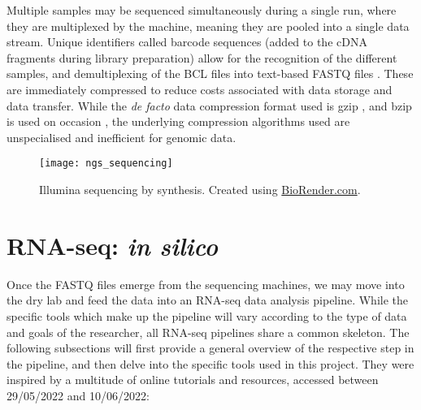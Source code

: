Multiple samples may be sequenced simultaneously during a single run, where they are multiplexed by the machine, meaning they are pooled into a single data stream. Unique identifiers called barcode sequences (added to the cDNA fragments during library preparation) allow for the recognition of the different samples, and demultiplexing of the BCL files into text-based FASTQ files \citep{cock2010sanger}. These are immediately compressed to reduce costs associated with data storage and data transfer. While the \textit{de facto} data compression format used is gzip \citep{deutsch1996gzip}, and bzip is used on occasion \citep{seward1996bzip2}, the underlying compression algorithms used are unspecialised and inefficient for genomic data.

\begin{figure}[!h]
    \centering
    \texttt{[image: ngs\_sequencing]}
    \caption[Sequencing by synthesis]{Illumina sequencing by synthesis. Created using \href{https://biorender.com/}{BioRender.com}. } 
    \label{fig:ngs_sequencing}
\end{figure}





\section{RNA-seq: \textit{in silico}}
\label{RNA-seq: in silico}

Once the FASTQ files emerge from the sequencing machines, we may move into the dry lab and feed the data into an RNA-seq data analysis pipeline. While the specific tools which make up the pipeline will vary according to the type of data and goals of the researcher, all RNA-seq pipelines share a common skeleton. The following subsections will first provide a general overview of the respective step in the pipeline, and then delve into the specific tools used in this project. They were inspired by a multitude of online tutorials and resources, accessed between 29/05/2022 and 10/06/2022:

